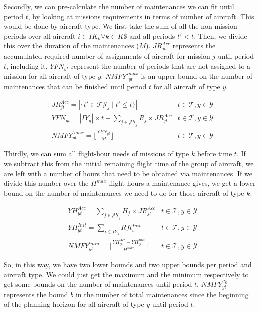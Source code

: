 \documentclass[a4paper,onecolumn,fleqn]{article}
\begin{document}
Secondly, we can pre-calculate the number of maintenances we can fit until period $t$, by looking at missions requirements in terms of number of aircraft. This would be done by aircraft type. We first take the sum of all the non-mission periods over all aircraft $i \in IK_k \forall k \in K$\$ and all periods $t' < t$. Then, we divide this over the duration of the maintenances ($M$). $JR^{Acc}_{jt}$ represents the accumulated required number of assignments of aircraft for mission $j$ until period $t$, including it. $YFN_{yt}$ represent the number of periods that are not assigned to a mission for all aircraft of type $y$. $NMFY'^{max}_{yt}$ is an upper bound on the number of maintenances that can be finished until period $t$ for all aircraft of type $y$.

\begin{align}
  & JR^{Acc}_{jt} = |\{t' \in \mathcal{TJ}_j \mid t' \le t\}| 
      & t \in \mathcal{T}, y \in \mathcal{Y}\\
  & YFN_{yt} = |IY_y| \times t -  \sum_{j \in \mathcal{JY}_y} R_j \times JR^{Acc}_{jt} 
      & t \in \mathcal{T}, y \in \mathcal{Y}\\
  & NMFY^{\prime max}_{yt} = \lfloor \frac{YFN_{yt}}{M} \rfloor 
      & t \in \mathcal{T}, y \in \mathcal{Y}
\end{align}

Thirdly, we can sum all flight-hour needs of missions of type $k$ before time $t$. If we subtract this from the initial remaining flight time of the group of aircraft, we are left with a number of hours that need to be obtained via maintenances. If we divide this number over the $H^{max}$ flight hours a maintenance gives, we get a lower bound on the number of maintenances we need to do for those aircraft of type $k$.

\begin{align}
  & YH^{Acc}_{yt} =  \sum_{j \in \mathcal{JY}_y} H_j \times JR^{Acc}_{jt} 
      & t \in \mathcal{T}, y \in \mathcal{Y}\\
  & YH^{Init}_{yt} = \sum_{i \in IY_y} Rft^{Init}_i 
      & t \in \mathcal{T}, y \in \mathcal{Y}\\
  & NMFY^{\prime min}_{yt} =  \lceil \frac{YH^{Acc}_{yt} - YH^{Init}_{yt}}{H^{max}} \rceil
      & t \in \mathcal{T}, y \in \mathcal{Y}
\end{align}

So, in this way, we have two lower bounds and two upper bounds per period and aircraft type. We could just get the maximum and the minimum respectively to get some bounds on the number of maintenances until period $t$. $NMFY^{\prime\prime b}_{yt}$ represents the bound $b$ in the number of total maintenances since the beginning of the planning horizon for all aircraft of type $y$ until period $t$.
\end{document}
